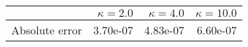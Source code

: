 \begin{tabular}{lrrr}
\toprule
 & $\kappa = 2.0$ & $\kappa = 4.0$ & $\kappa = 10.0$ \\
\midrule
Absolute error & 3.70e-07 & 4.83e-07 & 6.60e-07 \\
\bottomrule
\end{tabular}
